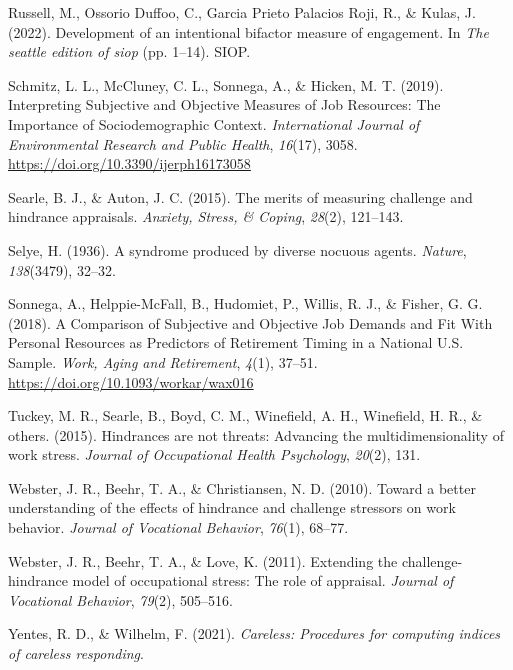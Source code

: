\documentclass[
  english,
  man]{apa6}
\begin{document}
\leavevmode\hypertarget{ref-engage_2022}{}%
Russell, M., Ossorio Duffoo, C., Garcia Prieto Palacios Roji, R., \& Kulas, J. (2022). Development of an intentional bifactor measure of engagement. In \emph{The seattle edition of siop} (pp. 1--14). SIOP.

\leavevmode\hypertarget{ref-schmitz_interpreting_2019}{}%
Schmitz, L. L., McCluney, C. L., Sonnega, A., \& Hicken, M. T. (2019). Interpreting Subjective and Objective Measures of Job Resources: The Importance of Sociodemographic Context. \emph{International Journal of Environmental Research and Public Health}, \emph{16}(17), 3058. \url{https://doi.org/10.3390/ijerph16173058}

\leavevmode\hypertarget{ref-searle2015merits}{}%
Searle, B. J., \& Auton, J. C. (2015). The merits of measuring challenge and hindrance appraisals. \emph{Anxiety, Stress, \& Coping}, \emph{28}(2), 121--143.

\leavevmode\hypertarget{ref-selye1936syndrome}{}%
Selye, H. (1936). A syndrome produced by diverse nocuous agents. \emph{Nature}, \emph{138}(3479), 32--32.

\leavevmode\hypertarget{ref-sonnega_comparison_2018}{}%
Sonnega, A., Helppie-McFall, B., Hudomiet, P., Willis, R. J., \& Fisher, G. G. (2018). A Comparison of Subjective and Objective Job Demands and Fit With Personal Resources as Predictors of Retirement Timing in a National U.S. Sample. \emph{Work, Aging and Retirement}, \emph{4}(1), 37--51. \url{https://doi.org/10.1093/workar/wax016}

\leavevmode\hypertarget{ref-tuckey2015hindrances}{}%
Tuckey, M. R., Searle, B., Boyd, C. M., Winefield, A. H., Winefield, H. R., \& others. (2015). Hindrances are not threats: Advancing the multidimensionality of work stress. \emph{Journal of Occupational Health Psychology}, \emph{20}(2), 131.

\leavevmode\hypertarget{ref-webster2010toward}{}%
Webster, J. R., Beehr, T. A., \& Christiansen, N. D. (2010). Toward a better understanding of the effects of hindrance and challenge stressors on work behavior. \emph{Journal of Vocational Behavior}, \emph{76}(1), 68--77.

\leavevmode\hypertarget{ref-webster2011extending}{}%
Webster, J. R., Beehr, T. A., \& Love, K. (2011). Extending the challenge-hindrance model of occupational stress: The role of appraisal. \emph{Journal of Vocational Behavior}, \emph{79}(2), 505--516.

\leavevmode\hypertarget{ref-R-careless}{}%
Yentes, R. D., \& Wilhelm, F. (2021). \emph{Careless: Procedures for computing indices of careless responding}.

\endgroup
\end{document}
